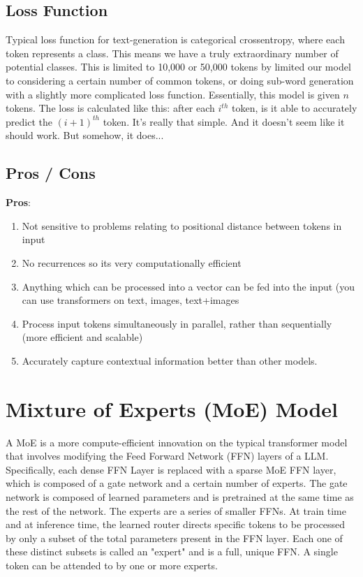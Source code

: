\documentclass[12pt]{article}
\begin{document}
\subsection{Loss Function}
Typical loss function for text-generation is categorical crossentropy, where each token represents a class. This means we have a truly extraordinary number of potential classes. This is limited to 10,000 or 50,000 tokens by limited our model to considering a certain number of common tokens, or doing sub-word generation with a slightly more complicated loss function. Essentially, this model is given \(n\) tokens. The loss is calculated like this: after each \(i^{th}\) token, is it able to accurately predict the \((i+1)^{th}\) token. It's really that simple. And it doesn't seem like it should work. But somehow, it does...

\subsection{Pros / Cons}
\textbf{Pros}: 
\begin{enumerate}
\item Not sensitive to problems relating to positional distance between tokens in input
\item No recurrences so its very computationally efficient
\item Anything which can be processed into a vector can be fed into the input (you can use transformers on text, images, text+images
\item Process input tokens simultaneously in parallel, rather than sequentially (more efficient and scalable)
\item Accurately capture contextual information better than other models.
\end{enumerate}
\section{Mixture of Experts (MoE) Model}
A MoE is a more compute-efficient innovation on the typical transformer model that involves modifying the Feed Forward Network (FFN) layers of a LLM. Specifically, each dense FFN Layer is replaced with a sparse MoE FFN layer, which is composed of a gate network and a certain number of experts. The gate network is composed of learned parameters and is pretrained at  the same time as the rest of the network. The experts are a series of smaller FFNs. At train time and at inference time, the learned router directs specific tokens to be processed by only a subset of the total parameters present in the FFN layer. Each one of these distinct subsets is called an "expert" and is a full, unique FFN. A single token can be attended to by one or more experts. 
\end{document}
